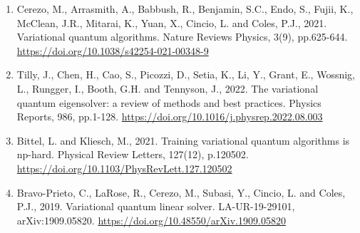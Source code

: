 \documentclass[a4paper,11pt]{article}
\begin{document}
\begin{enumerate}
\def\labelenumi{\arabic{enumi}.}

\item Cerezo, M., Arrasmith, A., Babbush, R., Benjamin, S.C., Endo, S., Fujii, K., McClean, J.R., Mitarai, K., Yuan, X., Cincio, L. and Coles, P.J., 2021. Variational quantum algorithms. Nature Reviews Physics, 3(9), pp.625-644. \url{https://doi.org/10.1038/s42254-021-00348-9}

\item Tilly, J., Chen, H., Cao, S., Picozzi, D., Setia, K., Li, Y., Grant, E., Wossnig, L., Rungger, I., Booth, G.H. and Tennyson, J., 2022. The variational quantum eigensolver: a review of methods and best practices. Physics Reports, 986, pp.1-128. \url{https://doi.org/10.1016/j.physrep.2022.08.003}

\item Bittel, L. and Kliesch, M., 2021. Training variational quantum algorithms is np-hard. Physical Review Letters, 127(12), p.120502. \url{https://doi.org/10.1103/PhysRevLett.127.120502}


\item Bravo-Prieto, C., LaRose, R., Cerezo, M., Subasi, Y., Cincio, L. and Coles, P.J., 2019. Variational quantum linear solver. LA-UR-19-29101, arXiv:1909.05820. \url{https://doi.org/10.48550/arXiv.1909.05820}




\end{enumerate}
\end{document}
